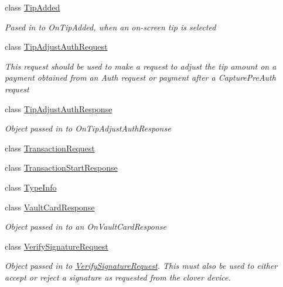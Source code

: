 \begin{DoxyCompactItemize}
class \hyperlink{classcom_1_1clover_1_1remotepay_1_1sdk_1_1_tip_added}{Tip\+Added}
\begin{DoxyCompactList}\small\item\em Pased in to On\+Tip\+Added, when an on-\/screen tip is selected \end{DoxyCompactList}\item 
class \hyperlink{classcom_1_1clover_1_1remotepay_1_1sdk_1_1_tip_adjust_auth_request}{Tip\+Adjust\+Auth\+Request}
\begin{DoxyCompactList}\small\item\em This request should be used to make a request to adjust the tip amount on a payment obtained from an Auth request or payment after a Capture\+Pre\+Auth request \end{DoxyCompactList}\item 
class \hyperlink{classcom_1_1clover_1_1remotepay_1_1sdk_1_1_tip_adjust_auth_response}{Tip\+Adjust\+Auth\+Response}
\begin{DoxyCompactList}\small\item\em Object passed in to On\+Tip\+Adjust\+Auth\+Response \end{DoxyCompactList}\item 
class \hyperlink{classcom_1_1clover_1_1remotepay_1_1sdk_1_1_transaction_request}{Transaction\+Request}
\item 
class \hyperlink{classcom_1_1clover_1_1remotepay_1_1sdk_1_1_transaction_start_response}{Transaction\+Start\+Response}
\item 
class \hyperlink{classcom_1_1clover_1_1remotepay_1_1sdk_1_1_type_info}{Type\+Info}
\item 
class \hyperlink{classcom_1_1clover_1_1remotepay_1_1sdk_1_1_vault_card_response}{Vault\+Card\+Response}
\begin{DoxyCompactList}\small\item\em Object passed in to an On\+Vault\+Card\+Response \end{DoxyCompactList}\item 
class \hyperlink{classcom_1_1clover_1_1remotepay_1_1sdk_1_1_verify_signature_request}{Verify\+Signature\+Request}
\begin{DoxyCompactList}\small\item\em Object passed in to \hyperlink{classcom_1_1clover_1_1remotepay_1_1sdk_1_1_verify_signature_request}{Verify\+Signature\+Request}. This must also be used to either accept or reject a signature as requested from the clover device. \end{DoxyCompactList}\item 

\end{DoxyCompactItemize}
